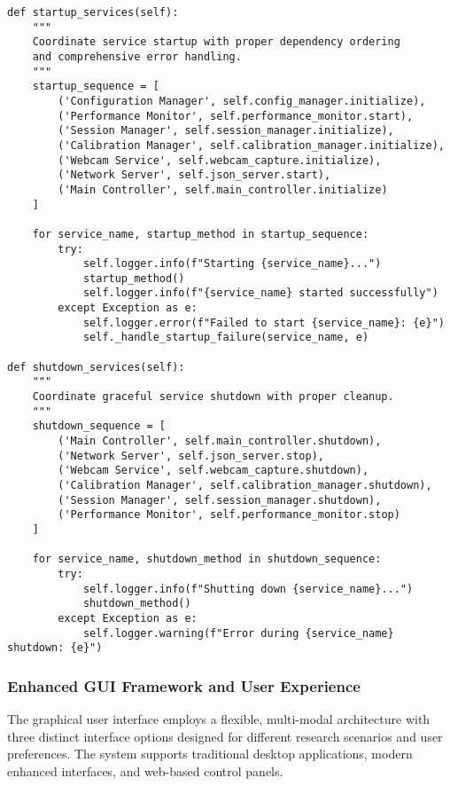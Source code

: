 \documentclass[12pt,a4paper]{article}
\begin{document}
\begin{verbatim}
def startup_services(self):
    """
    Coordinate service startup with proper dependency ordering
    and comprehensive error handling.
    """
    startup_sequence = [
        ('Configuration Manager', self.config_manager.initialize),
        ('Performance Monitor', self.performance_monitor.start),
        ('Session Manager', self.session_manager.initialize),
        ('Calibration Manager', self.calibration_manager.initialize),
        ('Webcam Service', self.webcam_capture.initialize),
        ('Network Server', self.json_server.start),
        ('Main Controller', self.main_controller.initialize)
    ]
    
    for service_name, startup_method in startup_sequence:
        try:
            self.logger.info(f"Starting {service_name}...")
            startup_method()
            self.logger.info(f"{service_name} started successfully")
        except Exception as e:
            self.logger.error(f"Failed to start {service_name}: {e}")
            self._handle_startup_failure(service_name, e)

def shutdown_services(self):
    """
    Coordinate graceful service shutdown with proper cleanup.
    """
    shutdown_sequence = [
        ('Main Controller', self.main_controller.shutdown),
        ('Network Server', self.json_server.stop),
        ('Webcam Service', self.webcam_capture.shutdown),
        ('Calibration Manager', self.calibration_manager.shutdown),
        ('Session Manager', self.session_manager.shutdown),
        ('Performance Monitor', self.performance_monitor.stop)
    ]
    
    for service_name, shutdown_method in shutdown_sequence:
        try:
            self.logger.info(f"Shutting down {service_name}...")
            shutdown_method()
        except Exception as e:
            self.logger.warning(f"Error during {service_name} shutdown: {e}")
\end{verbatim}

\subsubsection{Enhanced GUI Framework and User Experience}

The graphical user interface employs a flexible, multi-modal architecture with three distinct interface options designed
for different research scenarios and user preferences. The system supports traditional desktop applications, modern
enhanced interfaces, and web-based control panels.
\end{document}
